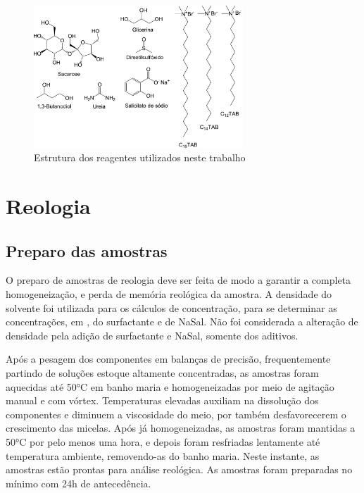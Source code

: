 	\begin{figure}[h]
		\centering
		\includegraphics[width=0.7\textwidth]{imagens/introducao/reagentes}
		\caption{Estrutura dos reagentes utilizados neste trabalho}
		\label{fig:reagentes}
	\end{figure}
	
	\FloatBarrier
	
	
	
	\chapter{Reologia}
		\section{Preparo das amostras}
		\label{sec:reologia_preparo_amostra}
		O preparo de amostras de reologia deve ser feita de modo a garantir a completa homogeneização, e perda de memória reológica da amostra. A densidade do solvente foi utilizada para os cálculos de concentração, para se determinar as concentrações, em \mM, do surfactante e de NaSal. Não foi considerada a alteração de densidade pela adição de surfactante e NaSal, somente dos aditivos.
		
		Após a pesagem dos componentes em balanças de precisão, frequentemente partindo de soluções estoque altamente concentradas, as amostras foram aquecidas até 50°C em banho maria e homogeneizadas por meio de agitação manual e com vórtex. Temperaturas elevadas auxiliam na dissolução dos componentes e diminuem a viscosidade do meio, por também desfavorecerem o crescimento das micelas. Após já homogeneizadas, as amostras foram mantidas a 50°C por pelo menos uma hora, e depois foram resfriadas lentamente até temperatura ambiente, removendo-as do banho maria. Neste instante, as amostras estão prontas para análise reológica. As amostras foram preparadas no mínimo com 24h de antecedência.
		
